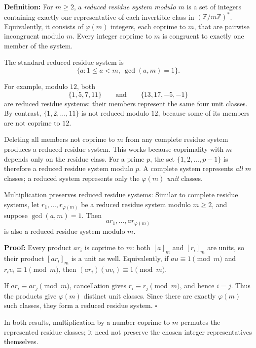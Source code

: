 \documentclass[a4paper,11pt,abstracton]{scrartcl}
\theoremstyle{dotlessP}
\theoremstyle{dotlessS}
\theoremstyle{remark}
\theoremstyle{definition}
\begin{document}
\begin{definition_box}
\textbf{Definition:}
For $m\geq2$, a \emph{reduced residue system modulo $m$} is a set of
integers containing exactly one representative of each invertible
class in $(\mathbb{Z}/m\mathbb{Z})^*$.
Equivalently, it consists of $\varphi(m)$ integers, each coprime to
$m$, that are pairwise incongruent modulo $m$.
Every integer coprime to $m$ is congruent to exactly one member of
the system.

The standard reduced residue system is
\[
    \{a:1\leq a<m,\ \gcd(a,m)=1\}.
\]
\end{definition_box}


\begin{example_box}
For example, modulo $12$, both
\[
    \{1,5,7,11\}\qquad\text{and}\qquad\{13,17,-5,-1\}
\]
are reduced residue systems: their members represent the same four
unit classes. By contrast, $\{1,2,\ldots,11\}$ is not reduced modulo
$12$, because some of its members are not coprime to $12$.
\end{example_box}


Deleting all members not coprime to $m$ from any complete residue
system produces a reduced residue system. This works because
coprimality with $m$ depends only on the residue class.
For a prime $p$, the set $\{1,2,\ldots,p-1\}$ is therefore a reduced
residue system modulo $p$.
A complete system represents \emph{all} $m$ classes; a reduced system
represents only the $\varphi(m)$ \emph{unit} classes.

\begin{mainbox}{Multiplication preserves reduced residue systems:}
Similar to complete residue systems, let $r_1,\ldots,r_{\varphi(m)}$ be a reduced residue system modulo
$m\geq2$, and suppose $\gcd(a,m)=1$. Then
\[
    ar_1,\ldots,ar_{\varphi(m)}
\]
is also a reduced residue system modulo $m$.
\end{mainbox}

\textbf{Proof:}
Every product $ar_i$ is coprime to $m$: both $[a]_m$ and
$[r_i]_m$ are units, so their product $[ar_i]_m$ is a unit as well.
Equivalently, if $au\equiv1\pmod m$ and $r_iv_i\equiv1\pmod m$,
then $(ar_i)(uv_i)\equiv1\pmod m$.

If $ar_i\equiv ar_j\pmod m$, cancellation gives
$r_i\equiv r_j\pmod m$, and hence $i=j$.
Thus the products give $\varphi(m)$ distinct unit classes.
Since there are exactly $\varphi(m)$ such classes, they form a
reduced residue system.
\hfill$\square$


In both results, multiplication by a number coprime to $m$ permutes
the represented residue classes; it need not preserve the chosen
integer representatives themselves.
\end{document}
